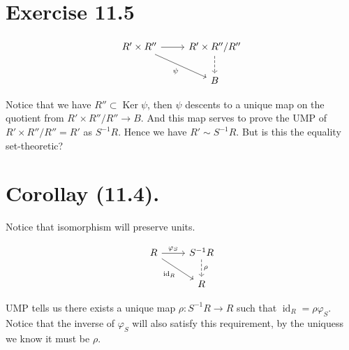 
\section{Exercise 11.5}

\[\begin{tikzcd}
	{R'\times R''} & {R'\times R''/R''} \\
	& B
	\arrow[from=1-1, to=1-2]
	\arrow["\psi"', from=1-1, to=2-2]
	\arrow[dashed, from=1-2, to=2-2]
\end{tikzcd}\]

Notice that we have $R''\subset \operatorname{Ker}\psi$, then $\psi$ descents to a unique map on the quotient from $R'\times R''/R''\to B$. And this map serves to prove the UMP of $R'\times R''/R''=R'$ as $S^{-1}R$. Hence we have $R'\sim S^{-1}R$. But is this the equality set-theoretic?

\section{Corollay (11.4).}

Notice that isomorphism will preserve units.

\[\begin{tikzcd}
	R & {S^{-1}R} \\
	& R
	\arrow["{\varphi_S}", from=1-1, to=1-2]
	\arrow["{\operatorname{id}_R}"', from=1-1, to=2-2]
	\arrow["\rho", dashed, from=1-2, to=2-2]
\end{tikzcd}\]

UMP tells us there exists a unique map $\rho:S^{-1}R\to R$ such that $\operatorname{id}_R=\rho\varphi_S$. Notice that the inverse of $\varphi_S$ will also satisfy this requirement, by the uniquess we know it must be $\rho$.